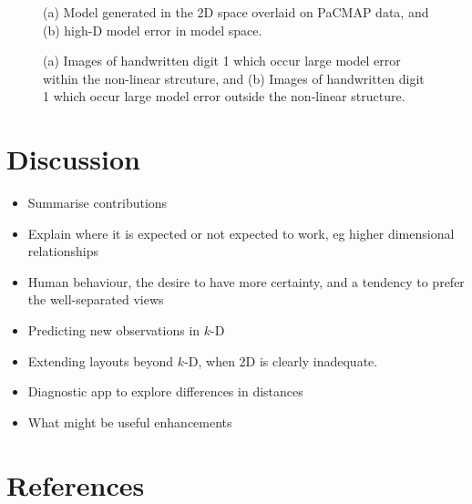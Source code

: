 \documentclass[
  12pt]{article}
\providecommand{\tightlist}{%
  \setlength{\itemsep}{0pt}\setlength{\parskip}{0pt}}\usepackage{longtable,booktabs,array}
\def\tightlist{}
\begin{document}
\begin{figure}[H]


\caption{\label{fig-model-mnist}(a) Model generated in the 2D space
overlaid on PaCMAP data, and (b) high-D model error in model space.}

\end{figure}%

\begin{figure}[H]


\caption{\label{fig-anomalies}(a) Images of handwritten digit 1 which
occur large model error within the non-linear strcuture, and (b) Images
of handwritten digit 1 which occur large model error outside the
non-linear structure.}

\end{figure}%

\section{Discussion}\label{sec-discussion}

\begin{itemize}
\tightlist
\item
  Summarise contributions
\item
  Explain where it is expected or not expected to work, eg higher
  dimensional relationships
\item
  Human behaviour, the desire to have more certainty, and a tendency to
  prefer the well-separated views
\item
  Predicting new observations in \(k\)-D
\item
  Extending layouts beyond \(k\)-D, when 2D is clearly inadequate.
\item
  Diagnostic app to explore differences in distances
\item
  What might be useful enhancements
\end{itemize}

\section*{References}\label{references}

\renewcommand{\bibsection}{}


\newpage{}
\end{document}
